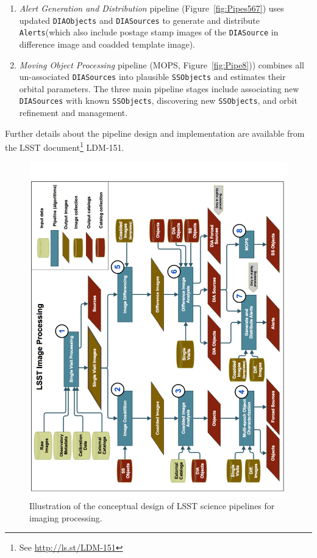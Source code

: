 \documentclass[12pt]{article}
\newcommand{\code}[1]{\texttt{#1}}
\newcommand{\Alerts}{\code{Alerts}\xspace}
\newcommand{\DIASource}{\code{DIASource}\xspace}
\newcommand{\DIASources}{\code{DIASources}\xspace}
\newcommand{\DIAObjects}{\code{DIAObjects}\xspace}
\newcommand{\SSObjects}{\code{SSObjects}\xspace}
\begin{document}
\begin{enumerate}
overlapping the difference image it performs Forced Photometry and recomputes summary quantities.
During nightly Level 1 processing, this pipeline also performs Forced Photometry
for all new \DIAObjects on difference images from the last 30 days.
\item {\it Alert Generation and Distribution} pipeline (Figure~\ref{fig:Pipes567}) uses updated
\DIAObjects and \DIASources to generate and distribute \Alerts (which also include postage stamp
images of the \DIASource in difference image and coadded template image).
\item {\it Moving Object Processing} pipeline (MOPS, Figure~\ref{fig:Pipe8})) combines all
un-associated \DIASources into plausible \SSObjects and estimates their orbital parameters.
The three main pipeline stages include associating new \DIASources with known \SSObjects,
discovering new \SSObjects, and orbit refinement and management.
\end{enumerate}

Further details about the pipeline design and implementation are available from the LSST
document\footnote{See \url{http://ls.st/LDM-151}} LDM-151.

\begin{figure}[!t]
    \centering
    \vskip -0.1in
    \includegraphics[scale=0.515, angle=270]{gliffy/LSSTimageProcessingDetail1}
    \vskip -0.1in
    \caption{Illustration of the conceptual design of LSST science pipelines for imaging processing.\label{fig:Detail1}}
\end{figure}
\end{document}
